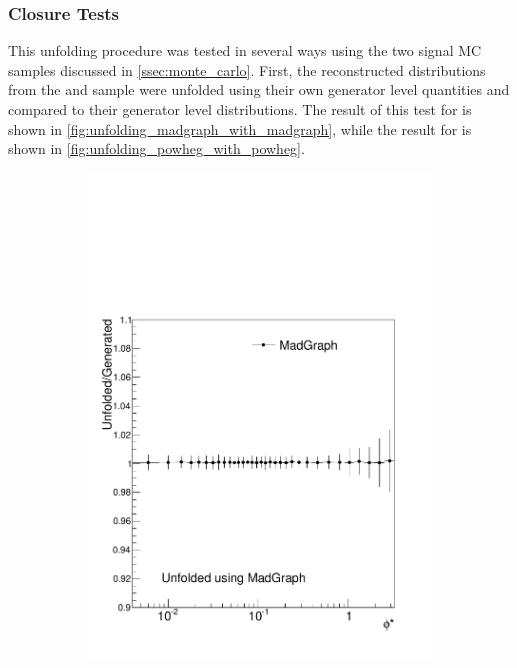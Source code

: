 \subsubsection{Closure Tests}

This unfolding procedure was tested in several ways using the two signal MC
samples discussed in \cref{ssec:monte_carlo}. First, the reconstructed
\phistar distributions from the \MADGRAPH and \POWHEG sample were unfolded
using their own generator level quantities and compared to their generator
level \phistar distributions.
The result of this test for \MADGRAPH is shown
in \cref{fig:unfolding_madgraph_with_madgraph}, while the result for
\POWHEG is shown in \cref{fig:unfolding_powheg_with_powheg}.

\begin{figure}[!htbp]
    \centering
    \begin{subfigure}[b]{\SideBySidePlotWidth}
        \includegraphics[width=\textwidth]{figures/BinM_MM.pdf}

\end{subfigure}
\end{figure}

